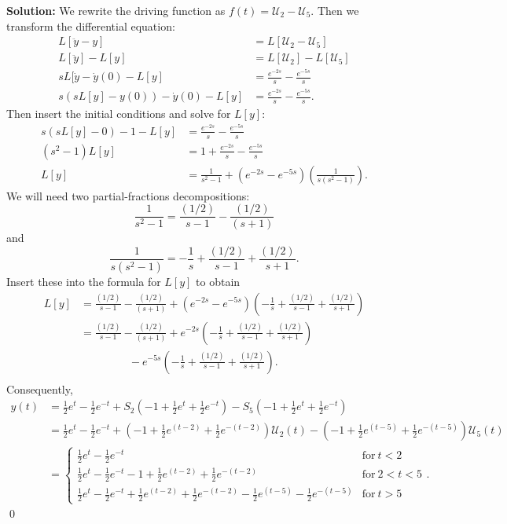 {{{{\bf Solution:} We rewrite the driving function as $f(t)=\mathcal{U}_2 - \mathcal{U}_5$.  Then we transform the differential equation:
\begin{align*}
L[\ddot{y} -y] &= L[\mathcal{U}_2 - \mathcal{U}_5] \\
L[\ddot{y}] -L[y] &= L[\mathcal{U}_2] - L[\mathcal{U}_5] \\
sL[\dot{y}-\dot{y}(0)-L[y] &= \frac{e^{-2s}}{s}-\frac{e^{-5s}}{s} \\
s(sL[y]-y(0))-\dot{y}(0)-L[y] & = \frac{e^{-2s}}{s}-\frac{e^{-5s}}{s}.
\end{align*}
Then insert the initial conditions and solve for $L[y]$:
\begin{align*}
s(sL[y]-0)-1-L[y] & = \frac{e^{-2s}}{s}-\frac{e^{-5s}}{s} \\
(s^2-1)L[y] & = 1+ \frac{e^{-2s}}{s}-\frac{e^{-5s}}{s} \\
L[y] & = \frac{1}{s^2-1} + (e^{-2s}-e^{-5s}) \left( \frac{1}{s(s^2-1)}\right).
\end{align*}
We will need two partial-fractions decompositions:
\[ \frac{1}{s^2-1}= \frac{(1/2)}{s-1}-\frac{(1/2)}{(s+1)}\]
and
\[ \frac{1}{s(s^2-1)}= -\frac{1}{s} + \frac{(1/2)}{s-1} + \frac{(1/2)}{s+1} .\]
Insert these into the formula for $L[y]$ to obtain
\begin{align*}
L[y] & = \frac{(1/2)}{s-1}-\frac{(1/2)}{(s+1)} + (e^{-2s}-e^{-5s})\left( -\frac{1}{s} + \frac{(1/2)}{s-1} + \frac{(1/2)}{s+1} \right) \\
& = \frac{(1/2)}{s-1}-\frac{(1/2)}{(s+1)} 
+ e^{-2s} \left( -\frac{1}{s} + \frac{(1/2)}{s-1} + \frac{(1/2)}{s+1} \right) \\
& \ \ \ \ \ \ \ \ \ \ \ \ \ \ \ \ \ \ \ \ -e^{-5s} \left( -\frac{1}{s} + \frac{(1/2)}{s-1} + \frac{(1/2)}{s+1} \right). \\
\end{align*}
Consequently,
\begin{align*}
y(t) & = \frac{1}{2}e^{t} - \frac{1}{2}e^{-t} +S_2\left( -1 +\frac{1}{2}e^{t}+\frac{1}{2}e^{-t} \right) -S_5\left( -1 +\frac{1}{2}e^{t}+\frac{1}{2}e^{-t} \right) \\
& = \frac{1}{2}e^{t} - \frac{1}{2}e^{-t} +\left( -1 +\frac{1}{2}e^{(t-2)}+\frac{1}{2}e^{-(t-2)} \right) \mathcal{U}_2(t) -\left( -1 +\frac{1}{2}e^{(t-5)}+\frac{1}{2}e^{-(t-5)} \right) \mathcal{U}_5(t) \\
& = \left\{ \begin{matrix} \frac{1}{2}e^t -\frac{1}{2}e^{-t} & \mbox{for} \ t < 2 \\ \frac{1}{2}e^t -\frac{1}{2}e^{-t}-1 +\frac{1}{2}e^{(t-2)}+\frac{1}{2}e^{-(t-2)} & \mbox{for} \ 2<t < 5 \\ \frac{1}{2}e^t -\frac{1}{2}e^{-t} +\frac{1}{2}e^{(t-2)}+\frac{1}{2}e^{-(t-2)} -\frac{1}{2}e^{(t-5)}-\frac{1}{2}e^{-(t-5)} & \mbox{for} \ t >5 \end{matrix} \right. .
\end{align*}
\qed



}}}
